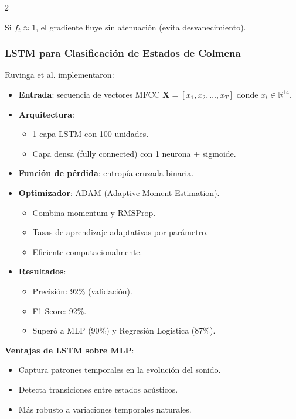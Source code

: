 \documentclass[12pt]{report}
\newenvironment{tightmulticols}{%
  \begin{multicols}{2}
  \setlength{\parskip}{1.2pt}
  \linespread{1}\selectfont
}{%
  \end{multicols}
}
\begin{document}
\begin{tightmulticols}
\noindent Si $f_t \approx 1$, el gradiente fluye sin atenuación (evita desvanecimiento).

\subsubsection{LSTM para Clasificación de Estados de Colmena}

\noindent Ruvinga et al. \cite{ruvinga2021, ruvinga2023} implementaron:

\begin{itemize}
    \item \textbf{Entrada}: secuencia de vectores MFCC $\mathbf{X} = [x_1, x_2, \ldots, x_T]$ donde $x_t \in \mathbb{R}^{14}$.
    \item \textbf{Arquitectura}:
    \begin{itemize}
        \item 1 capa LSTM con 100 unidades.
        \item Capa densa (fully connected) con 1 neurona + sigmoide.
    \end{itemize}
    \item \textbf{Función de pérdida}: entropía cruzada binaria.
    \item \textbf{Optimizador}: ADAM (Adaptive Moment Estimation).
    \begin{itemize}
        \item Combina momentum y RMSProp.
        \item Tasas de aprendizaje adaptativas por parámetro.
        \item Eficiente computacionalmente.
    \end{itemize}
    \item \textbf{Resultados}:
    \begin{itemize}
        \item Precisión: 92\% (validación).
        \item F1-Score: 92\%.
        \item Superó a MLP (90\%) y Regresión Logística (87\%).
    \end{itemize}
\end{itemize}

\noindent\textbf{Ventajas de LSTM sobre MLP}:
\begin{itemize}
    \item Captura patrones temporales en la evolución del sonido.
    \item Detecta transiciones entre estados acústicos.
    \item Más robusto a variaciones temporales naturales.
\end{itemize}


\end{tightmulticols}
\end{document}
